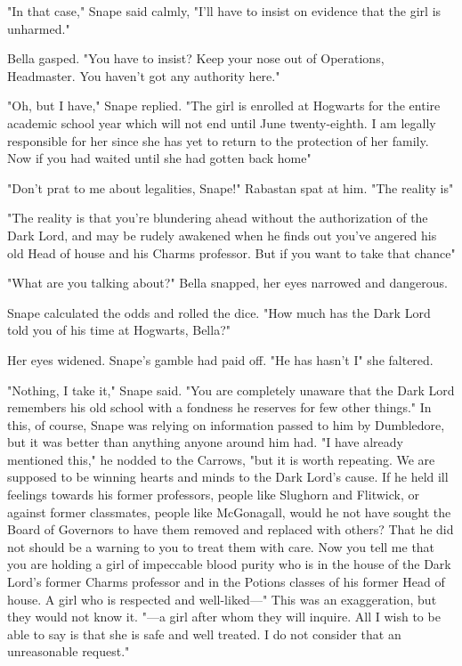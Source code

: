 "In that case," Snape said calmly, "I'll have to insist on evidence that the girl is unharmed."

Bella gasped. "You have to insist? Keep your nose out of Operations, Headmaster. You haven't got any authority here."

"Oh, but I have," Snape replied. "The girl is enrolled at Hogwarts for the entire academic school year which will not end until June twenty-eighth. I am legally responsible for her since she has yet to return to the protection of her family. Now if you had waited until she had gotten back home{\el}"

"Don't prat to me about legalities, Snape!" Rabastan spat at him. "The reality is{\el}"

"The reality is that you're blundering ahead without the authorization of the Dark Lord, and may be rudely awakened when he finds out you've angered his old Head of house and his Charms professor. But if you want to take that chance{\el}"

"What are you talking about?" Bella snapped, her eyes narrowed and dangerous.

Snape calculated the odds and rolled the dice. "How much has the Dark Lord told you of his time at Hogwarts, Bella?"

Her eyes widened. Snape's gamble had paid off. "He has{\el} hasn't{\el} I{\el}" she faltered.

"Nothing, I take it," Snape said. "You are completely unaware that the Dark Lord remembers his old school with a fondness he reserves for few other things." In this, of course, Snape was relying on information passed to him by Dumbledore, but it was better than anything anyone around him had. "I have already mentioned this," he nodded to the Carrows, "but it is worth repeating. We are supposed to be winning hearts and minds to the Dark Lord's cause. If he held ill feelings towards his former professors, people like Slughorn and Flitwick, or against former classmates, people like McGonagall, would he not have sought the Board of Governors to have them removed and replaced with others? That he did not should be a warning to you to treat them with care. Now you tell me that you are holding a girl of impeccable blood purity who is in the house of the Dark Lord's former Charms professor and in the Potions classes of his former Head of house. A girl who is respected and well-liked—" This was an exaggeration, but they would not know it. "—a girl after whom they will inquire. All I wish to be able to say is that she is safe and well treated. I do not consider that an unreasonable request."

